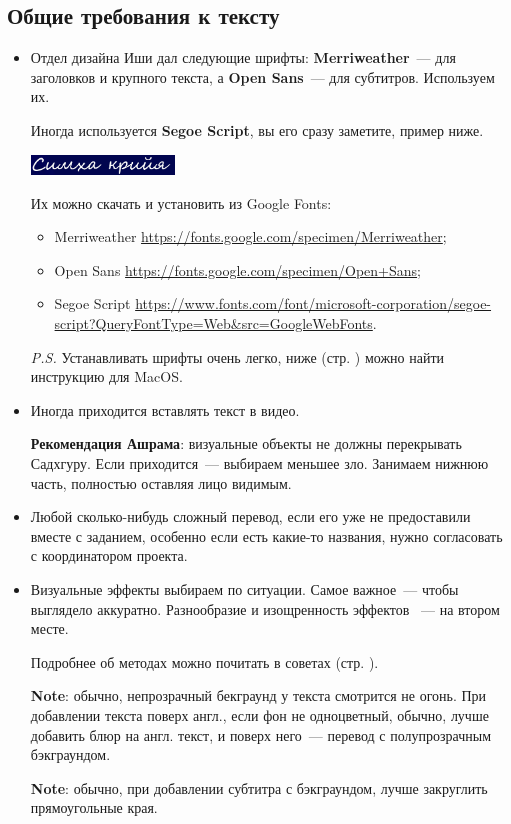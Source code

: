 \documentclass[
a4paper, %
12pt, %
article,
onecolumn, %
openany, %
]{memoir}
\begin{document}
\subsection{Общие требования к тексту}
\begin{itemize}
\item Отдел дизайна Иши дал следующие шрифты: 
    \textbf{Merriweather}~--- для заголовков и крупного текста, а 
    \textbf{Open Sans}~--- для субтитров. Используем их.

    Иногда используется \textbf{Segoe Script}, вы его сразу заметите, пример ниже.

    \includegraphics[width=0.3\textwidth]{segoeScript}

    Их можно скачать и установить из Google Fonts:
    \begin{itemize}
        \item  Merriweather \href{https://fonts.google.com/specimen/Merriweather}{\small https://fonts.google.com/specimen/Merriweather};
        \item Open Sans \href{https://fonts.google.com/specimen/Open+Sans}{\small https://fonts.google.com/specimen/Open+Sans};
    \item Segoe Script \href{https://www.fonts.com/font/microsoft-corporation/segoe-script?QueryFontType=Web&src=GoogleWebFonts}{\small https://www.fonts.com/font/microsoft-corporation/segoe-script?QueryFontType=Web\&src=GoogleWebFonts}.
    \end{itemize}

    \emph{P.S.} Устанавливать шрифты очень легко, 
    ниже (стр. \pageref{fonts}) можно найти инструкцию для MacOS.

\item Иногда приходится вставлять текст в видео. 

    \textbf{Рекомендация Ашрама}: визуальные объекты не должны перекрывать 
     Садхгуру. Если приходится~--- выбираем меньшее зло. Занимаем нижнюю часть, 
     полностью оставляя лицо видимым.

\item Любой сколько-нибудь сложный перевод, 
    {\color{gray} если его уже не предоставили вместе с заданием},
    особенно если есть какие-то названия, нужно согласовать 
    с координатором проекта.

\item Визуальные эффекты выбираем по ситуации. 
    Самое важное~--- чтобы выглядело аккуратно. Разнообразие и изощренность 
    эффектов ~--- на втором месте. 

    Подробнее об методах можно почитать в советах (стр. \pageref{advices}).  

    \textbf{Note}: обычно, непрозрачный бекграунд у текста 
    смотрится не огонь. При добавлении текста поверх англ.,
    если фон не одноцветный, обычно, лучше добавить блюр на англ.
    текст, и поверх него~--- перевод с полупрозрачным бэкграундом.

    \textbf{Note}: обычно, при добавлении субтитра с
     бэкграундом, лучше закруглить прямоугольные края. 
\end{itemize}
\end{document}
